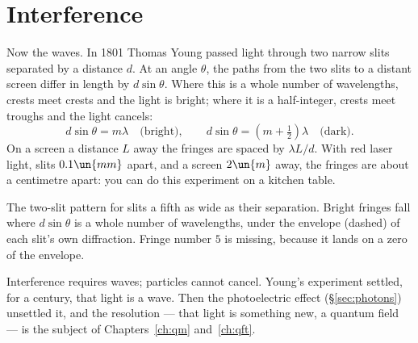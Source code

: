 \section{Interference}

Now the waves. In 1801 Thomas Young passed light through two narrow slits separated by a distance $d$. At an angle $\theta$, the paths from the two slits to a distant screen differ in length by $d\sin\theta$. Where this is a whole number of wavelengths, crests meet crests and the light is bright; where it is a half-integer, crests meet troughs and the light cancels:
\[
  d\sin\theta = m\lambda \quad\text{(bright)},\qquad d\sin\theta = (m+\tfrac12)\lambda\quad\text{(dark)}.
\]
On a screen a distance $L$ away the fringes are spaced by $\lambda L/d$. With red laser light, slits $0.1\un{mm}$ apart, and a screen $2\un{m}$ away, the fringes are about a centimetre apart: you can do this experiment on a kitchen table.

\begin{center}
\begin{minipage}{\linewidth}\centering
{}

{\small The two-slit pattern for slits a fifth as wide as their separation. Bright fringes fall where $d\sin\theta$ is a whole number of wavelengths, under the envelope (dashed) of each slit's own diffraction. Fringe number $5$ is missing, because it lands on a zero of the envelope.}
\end{minipage}
\end{center}

\begin{keyidea}
Interference requires waves; particles cannot cancel. Young's experiment settled, for a century, that light is a wave. Then the photoelectric effect (\S\ref{sec:photons}) unsettled it, and the resolution --- that light is something new, a quantum field --- is the subject of Chapters~\ref{ch:qm} and~\ref{ch:qft}.
\end{keyidea}

